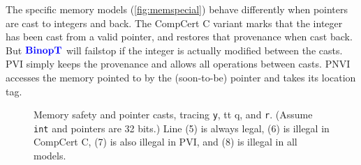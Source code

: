 \documentclass{llncs}
\begin{document}
The specific memory models (\cref{fig:memspecial}) behave differently when pointers are cast to integers and back.
The CompCert C variant marks that the integer has been cast from a valid pointer, and
restores that provenance when cast back. But \(\color{blue} \mathbf{BinopT}\) will failstop if the integer is
actually modified between the casts. PVI simply keeps the provenance and allows all operations
between casts. PNVI accesses the memory pointed to by the (soon-to-be) pointer and takes its
location tag.

\begin{figure}[t]
  \scriptsize
{}

\caption{Memory safety and pointer casts, tracing {\tt y}, {tt q}, and {\tt r}. (Assume {\tt int} and pointers are 32 bits.)
Line (5) is always legal, (6) is illegal in CompCert C, (7) is also illegal in PVI, and (8) is illegal in all models.}
\label{fig:memsafe}
\end{figure}
\end{document}
